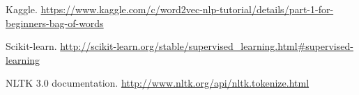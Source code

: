 \documentclass[11pt,a4paper]{article}
\begin{document}
\begin{thebibliography}{}

\bibitem{} Kaggle.
\newblock \url{https://www.kaggle.com/c/word2vec-nlp-tutorial/details/part-1-for-beginners-bag-of-words}

\bibitem{} Scikit-learn.
\newblock \url{http://scikit-learn.org/stable/supervised_learning.html#supervised-learning}

\bibitem{} NLTK 3.0 documentation.
\newblock \url{http://www.nltk.org/api/nltk.tokenize.html}


\end{thebibliography}
\end{document}
